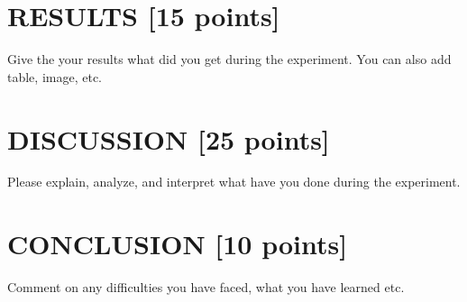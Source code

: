 \documentclass{article}
\begin{document}
\section{RESULTS [15 points]}
Give the your results what did you get during the experiment. You can also add table, image, etc. 

\section{DISCUSSION [25 points]}
Please explain, analyze, and interpret what have you done during the  experiment. 

\section{CONCLUSION [10 points]}
Comment on any difficulties you have faced, what you have learned etc.
\end{document}
